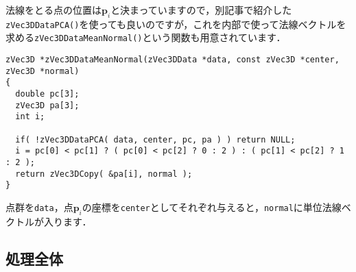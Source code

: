 ﻿\documentclass[a4paper]{jsarticle}
\begin{document}
法線をとる点の位置は$\boldsymbol{p}_{i}$と決まっていますので，別記事で紹介した\verb|zVec3DDataPCA()|を使っても良いのですが，これを内部で使って法線ベクトルを求める\verb|zVec3DDataMeanNormal()|という関数も用意されています．
\begin{screen}
\begin{verbatim}
zVec3D *zVec3DDataMeanNormal(zVec3DData *data, const zVec3D *center, zVec3D *normal)
{
  double pc[3];
  zVec3D pa[3];
  int i;

  if( !zVec3DDataPCA( data, center, pc, pa ) ) return NULL;
  i = pc[0] < pc[1] ? ( pc[0] < pc[2] ? 0 : 2 ) : ( pc[1] < pc[2] ? 1 : 2 );
  return zVec3DCopy( &pa[i], normal );
}
\end{verbatim}
\end{screen}
点群を\verb|data|，点$\boldsymbol{p}_{i}$の座標を\verb|center|としてそれぞれ与えると，\verb|normal|に単位法線ベクトルが入ります．

\subsection{処理全体}
\end{document}
